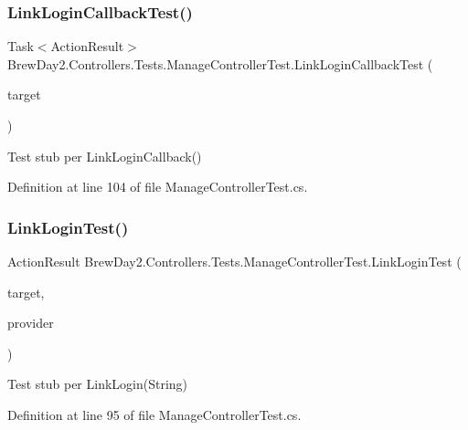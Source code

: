 \subsubsection{\texorpdfstring{Link\+Login\+Callback\+Test()}{LinkLoginCallbackTest()}}
{\footnotesize\ttfamily Task$<$Action\+Result$>$ Brew\+Day2.\+Controllers.\+Tests.\+Manage\+Controller\+Test.\+Link\+Login\+Callback\+Test (\begin{DoxyParamCaption}\item[{\mbox{[}\+Pex\+Assume\+Under\+Test\mbox{]} \mbox{\hyperlink{class_brew_day2_1_1_controllers_1_1_manage_controller}{Manage\+Controller}}}]{target }\end{DoxyParamCaption})}



Test stub per Link\+Login\+Callback()



Definition at line 104 of file Manage\+Controller\+Test.\+cs.

\mbox{\label{class_brew_day2_1_1_controllers_1_1_tests_1_1_manage_controller_test_a28c6621b1ee50163a279783f74a0730a}} 
\subsubsection{\texorpdfstring{Link\+Login\+Test()}{LinkLoginTest()}}
{\footnotesize\ttfamily Action\+Result Brew\+Day2.\+Controllers.\+Tests.\+Manage\+Controller\+Test.\+Link\+Login\+Test (\begin{DoxyParamCaption}\item[{\mbox{[}\+Pex\+Assume\+Under\+Test\mbox{]} \mbox{\hyperlink{class_brew_day2_1_1_controllers_1_1_manage_controller}{Manage\+Controller}}}]{target,  }\item[{string}]{provider }\end{DoxyParamCaption})}



Test stub per Link\+Login(\+String)



Definition at line 95 of file Manage\+Controller\+Test.\+cs.

